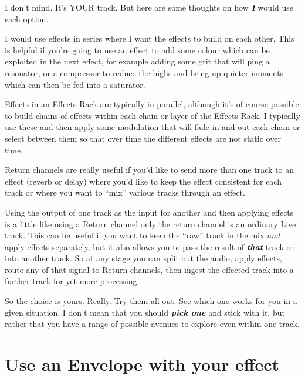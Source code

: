 \documentclass[
  12pt,
  letterpaper,
  oneside,
  open=any]{scrbook}
\begin{document}
I don't mind. It's YOUR track. But here are some thoughts on how
\textbf{\emph{I}} would use each option.

I would use effects in series where I want the effects to build on each
other. This is helpful if you're going to use an effect to add some
colour which can be exploited in the next effect, for example adding
some grit that will ping a resonator, or a compressor to reduce the
highs and bring up quieter moments which can then be fed into a
saturator.

Effects in an Effects Rack are typically in parallel, although it's of
course possible to build chains of effects within each chain or layer of
the Effects Rack. I typically use these and then apply some modulation
that will fade in and out each chain or select between them so that over
time the different effects are not static over time.

Return channels are really useful if you'd like to send more than one
track to an effect (reverb or delay) where you'd like to keep the effect
consistent for each track or where you want to ``mix'' various tracks
through an effect.

Using the output of one track as the input for another and then applying
effects is a little like using a Return channel only the return channel
is an ordinary Live track. This can be useful if you want to keep the
``raw'' track in the mix \emph{and} apply effects separately, but it
also allows you to pass the result of \textbf{\emph{that}} track on into
another track. So at any stage you can split out the audio, apply
effects, route any of that signal to Return channels, then ingest the
effected track into a further track for yet more processing.

So the choice is yours. Really. Try them all out. See which one works
for you in a given situation. I don't mean that you should
\textbf{\emph{pick one}} and stick with it, but rather that you have a
range of possible avenues to explore even within one track.

\section{Use an Envelope with your
effect}\label{use-an-envelope-with-your-effect}
\end{document}
